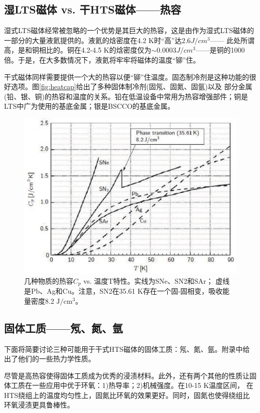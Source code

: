 \subsection{湿LTS磁体 vs. 干HTS磁体——热容}
湿式LTS磁体经常被忽略的一个优势是其巨大的热容，这是由作为湿式LTS磁体的一部分的大量液氦提供的。液氦的焓密度在4.2 K时“高”达$2.6 J/cm^3$——
此处所谓高，是和铜相比的。铜在4.2-4.5 K的焓密度仅为$\sim 0.0003J/cm^3$——是铜的1000倍。于是，在大多数情况下，液氦将牢牢将磁体的温度“铆”住。

干式磁体同样需要提供一个大的热容以便“铆”住温度。固态制冷剂是这种功能的很好选项。图\ref{fig:heatcap}给出了多种固体制冷剂(固氖、固氮、固氩)以及
部分金属(铅、银、铜)的热容和温度的关系。铅在低温设备中常用为热容增强部件；铜是LTS中广为使用的基底金属；银是BSCCO的基底金属。
\begin{figure}
  \centering
 \includegraphics[scale=0.7]{chpt4/figs/fig4.2.eps}
  \caption{几种物质的热容$C_p$ vs. 温度T特性。实线为SNe、SN2和SAr；
  虚线是Pb、Ag和Cu。注意，SN2在35.61 K存在一个固-固相变，吸收能量密度8.2 $\mathrm{J/cm^3}$。}
\end{figure}

\subsection{固体工质——氖、氮、氩}
下面将简要讨论三种可能用于干式HTS磁体的固体工质：氖、氮、氩。附录中给出了他们的一些热力学性质。

尽管是高热容使得固体工质成为优秀的浸渍材料。此外，还有两个其他的性质让固体工质在一些应用中优于环氧：1)热导率；2)机械强度。在10-15 K温度区间，
在HTS绕组上的温度均匀性上，固氮比环氧的效果更好。同时，固氮也使得绕组比环氧浸渍更具鲁棒性。

